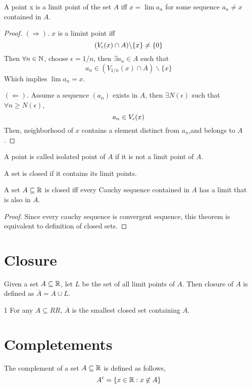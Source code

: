 \begin{theorem} A point x is a limit point of the set $A$ iff $x = \lim a_n$ for some sequence $a_n \neq x$ contained in $A$.
    \begin{proof}
        $(\Rightarrow)$. $x$ is a limint point iff
        \[ (V_{\epsilon}(x) \cap A) \backslash \{x\}  \neq \{ 0\}\]
        Then $\forall n \in {\mathbb{N}}$, choose $\epsilon = 1/n$, then $\exists a_n \in A$ such that
        \[ a_n \in (V_{1/n}(x) \cap A) \backslash \{x\}\]
        Which implies $\lim a_n = x$.

        $(\Leftarrow)$. Assume a sequence $(a_n)$ exists in $A$, then $\exists N(\epsilon)$ such that $\forall n \ge N(\epsilon)$,
        \[ a_n \in V_{\epsilon}(x)\]
        Then, neighborhood of $x$ contains a element distinct from $a_n$,and belongs to $A$.
    \end{proof}
\end{theorem}
\begin{definition} A point is called isolated point of $A$ if it is not a limit point of $A$.
\end{definition}
\begin{definition} A set is closed if it contains its limit points.
\end{definition}
\begin{theorem} A set $A \subseteq {\mathbb{R}}$ is closed iff every Cauchy sequence contained in $A$ has a limit that is also in $A$.
    \begin{proof}
        Since every cauchy sequence is convergent sequence, this theorem is equivalent to definition of closed sets.
    \end{proof}
\end{theorem}
\section{Closure}
\begin{definition}
    Given a set $A \subseteq {\mathbb{R}}$, let $L$ be the set of all limit points of $A$. Then closure of $A$ is defined as $\overline{A} = A \cup L$.
\end{definition}

\begin{theorem}1
    For any $A \subseteq RR$, $\overline{A}$ is the smallest closed set containing $A$.
\end{theorem}
\section{Completements}
\begin{definition} The complement of  a set $A \subseteq {\mathbb{R}}$ is defined as follows,
    \[ A^c = \{x \in {\mathbb{R}} : x \not\in A\}\]
\end{definition}

